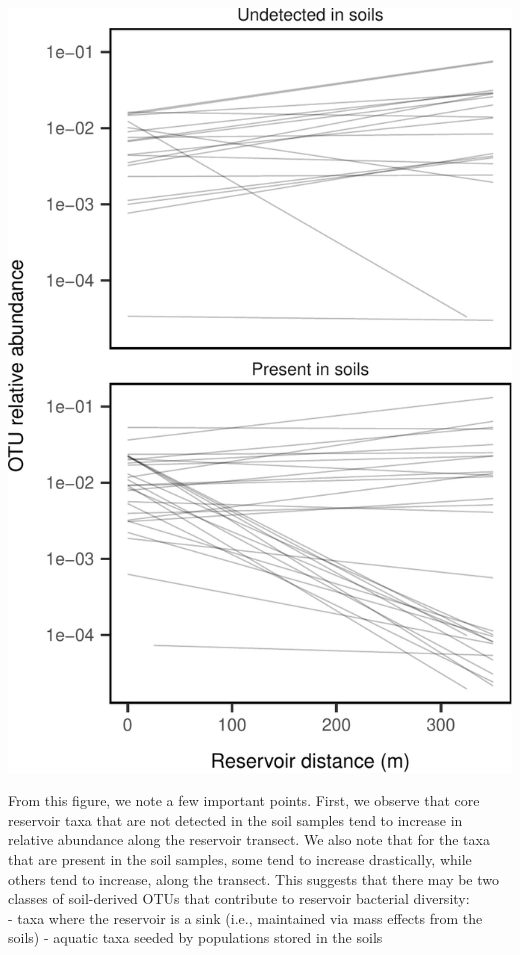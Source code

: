 \documentclass[]{article}
\begin{document}
\begin{center}\includegraphics{ReservoirGradient_files/figure-latex/coreplot-1} \end{center}

From this figure, we note a few important points. First, we observe that
core reservoir taxa that are not detected in the soil samples tend to
increase in relative abundance along the reservoir transect. We also
note that for the taxa that are present in the soil samples, some tend
to increase drastically, while others tend to increase, along the
transect. This suggests that there may be two classes of soil-derived
OTUs that contribute to reservoir bacterial diversity:\\
- taxa where the reservoir is a sink (i.e., maintained via mass effects
from the soils) - aquatic taxa seeded by populations stored in the soils
\end{document}
